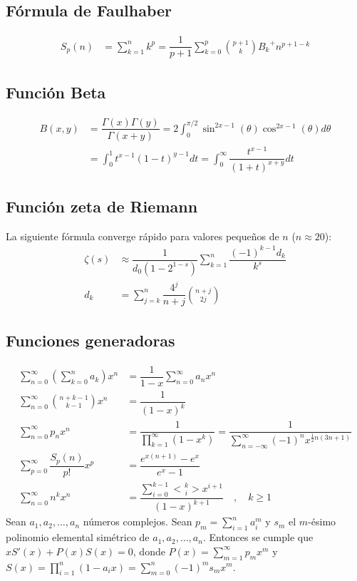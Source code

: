 \documentclass[11pt]{article}
\newcommand{\genEuler}[3]{%
	\genfrac{<}{>}{0pt}{#1}{#2}{#3}%
}
\newcommand{\euler}[2]{\genEuler{}{#1}{#2}}
\begin{document}
		\subsection{Fórmula de Faulhaber}
			\begin{align*}
				S_p(n) &= \sum_{k=1}^{n}k^p = \dfrac{1}{p+1}\sum_{k=0}^{p} \binom{p+1}{k} {B_k}^+ n^{p+1-k}
			\end{align*}
		
		\subsection{Función Beta}
			\begin{align*}
				B(x,y) &= \dfrac{\Gamma(x)\Gamma(y)}{\Gamma(x+y)} = 2 \int_{0}^{\pi/2} \sin^{2x-1}(\theta) \cos^{2x-1}(\theta) d\theta \\
				&= \int_{0}^{1} t^{x-1} (1-t)^{y-1} dt = \int_{0}^{\infty} \dfrac{t^{x-1}}{(1+t)^{x+y}} dt
			\end{align*}
			
		\subsection{Función zeta de Riemann}
			La siguiente fórmula converge rápido para valores pequeños de $n$ ($n \approx 20$):
			\begin{align*}
				\zeta(s) &\approx \dfrac{1}{d_0 (1 - 2^{1-s})} \sum_{k=1}^{n} \dfrac{(-1)^{k-1} d_k}{k^s} \\
				d_k &= \sum_{j=k}^{n} \dfrac{4^j}{n+j} \binom{n+j}{2j}
			\end{align*}
		
		\subsection{Funciones generadoras}
			\begin{align*}
				\sum_{n=0}^{\infty} \left( \sum_{k=0}^{n}a_k \right) x^n &= \dfrac{1}{1-x}\sum_{n=0}^{\infty} a_n x^n \\
				\sum_{n=0}^{\infty} \binom{n+k-1}{k-1}x^n &= \dfrac{1}{\left(1-x\right)^k} \\
				\sum_{n=0}^{\infty} p_n x^n &= \dfrac{1}{\displaystyle \prod_{k=1}^{\infty}(1-x^k)} = \dfrac{1}{\displaystyle \sum_{n=-\infty}^{\infty} (-1)^n x^{\frac{1}{2}n(3n+1)}} \\
				\sum_{p=0}^{\infty} \dfrac{S_p(n)}{p!} x^p &= \dfrac{e^{x(n+1)}-e^x}{e^x-1} \\
				\sum_{n=0}^{\infty} n^k x^n &= \dfrac{\displaystyle \sum_{i=0}^{k-1} \euler{k}{i} x^{i+1}}{(1-x)^{k+1}} \quad , \quad k \geq 1
			\end{align*}
			Sean $a_1, a_2, \ldots, a_n$ números complejos. Sean $p_m = \displaystyle \sum_{i=1}^{n} a_i^m$ y $s_m$ el $m$-ésimo polinomio elemental simétrico de $a_1, a_2, \ldots, a_n$. Entonces se cumple que $xS'(x) + P(x)S(x) = 0$, donde $P(x)=\displaystyle \sum_{m=1}^{\infty} p_m x^m$ y $S(x)=\displaystyle \prod_{i=1}^{n}(1-a_ix) = \sum_{m=0}^{n}(-1)^m s_m x^m$.
		
\end{document}
